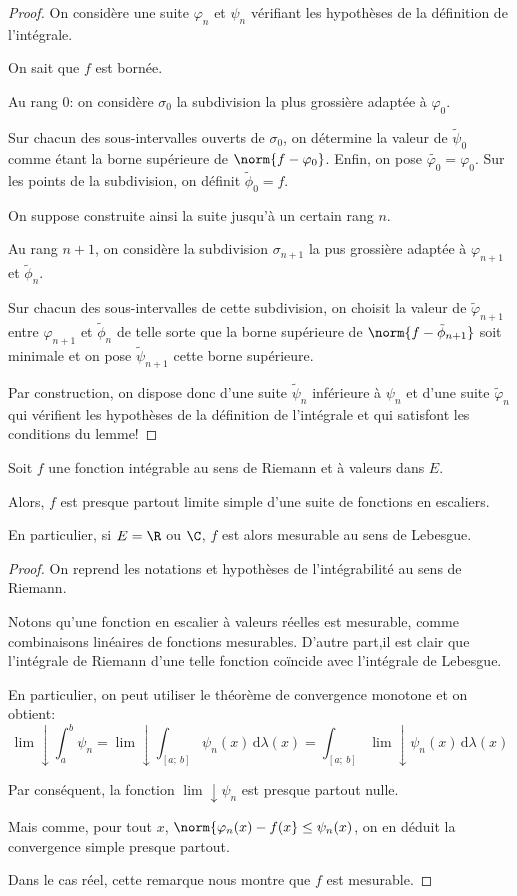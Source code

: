 \begin{proof}
On considère une suite $\varphi_n$ et $\psi_n$ vérifiant les hypothèses de la définition de l'intégrale.

On sait que $f$ est bornée. 

Au rang $0$: on considère $\sigma_0$ la subdivision la plus grossière adaptée à $\varphi_0$. 

Sur chacun des sous-intervalles ouverts de $\sigma_0$, on détermine la valeur de $\tilde{\psi}_0$ comme étant la borne supérieure de $\norm{f-\varphi_0}$. Enfin, on pose $\tilde{\varphi_0} = \varphi_0$. Sur les points de la subdivision, on définit $\tilde{\phi}_0 = f$.

On suppose construite ainsi la suite jusqu'à un certain rang $n$.

Au rang $n+1$, on considère la subdivision $\sigma_{n+1}$ la pus grossière adaptée à $\varphi_{n+1}$ et $\tilde{\phi}_n$.

Sur chacun des sous-intervalles de cette subdivision, on choisit la valeur de $\tilde{\varphi}_{n+1}$ entre $\varphi_{n+1}$ et $\tilde{\phi}_n$ de telle sorte que la borne supérieure de $\norm{f-\tilde{\phi}_{n+1}}$ soit minimale et on pose $\tilde{\psi}_{n+1}$ cette borne supérieure.

Par construction, on dispose donc d'une suite $\tilde{\psi}_n$ inférieure à $\psi_n$ et d'une suite $\tilde{\varphi}_n$ qui vérifient les hypothèses de la définition de l'intégrale et qui satisfont les conditions du lemme!
\end{proof}

\begin{theo}
Soit $f$ une fonction intégrable au sens de Riemann et à valeurs dans $E$.

Alors, $f$ est presque partout limite simple d'une suite de fonctions en escaliers. 

En particulier, si $E= \R$ ou  $\C$, $f$ est alors mesurable au sens de Lebesgue. 
\end{theo}

\begin{proof}
On reprend les notations et hypothèses de l'intégrabilité au sens de Riemann.

Notons qu'une fonction en escalier à valeurs réelles est mesurable, comme combinaisons linéaires de fonctions mesurables. D'autre part,il est clair que l'intégrale de Riemann d'une telle fonction coïncide avec l'intégrale de Lebesgue.

En particulier, on peut utiliser le théorème de convergence monotone et on obtient:
\[
\lim \downarrow \displaystyle{\int_a^b} \psi_n = \lim \downarrow \displaystyle{\int_{[a;~b]}} \psi_n(x) \, \mathrm d \lambda(x) = \displaystyle{\int_{[a;~b]}} \lim \downarrow \psi_n(x) \, \mathrm d \lambda(x)
\]

Par conséquent, la fonction $\lim \downarrow \psi_n$ est presque partout nulle.

Mais comme, pour tout $x$, $\norm{\varphi_n(x)-f(x} \leq \psi_n(x)$, on en déduit la convergence simple presque partout.

Dans le cas réel, cette remarque nous montre que $f$ est mesurable.
\end{proof}

